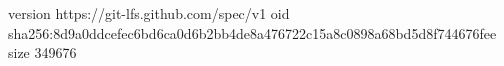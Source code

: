 version https://git-lfs.github.com/spec/v1
oid sha256:8d9a0ddcefec6bd6ca0d6b2bb4de8a476722c15a8c0898a68bd5d8f744676fee
size 349676
